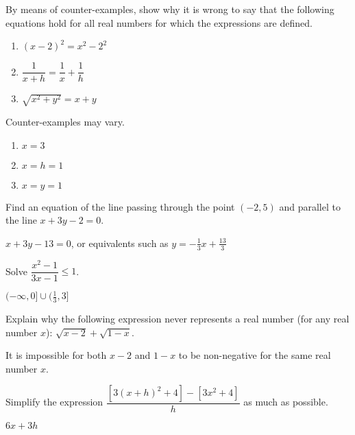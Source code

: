 \begin{enumialphparenastyle}
\begin{ex}
By means of counter-examples, show why it is wrong
to say that the following equations hold for all real numbers for which the
expressions are defined.
\begin{enumerate}
	\item	$(x-2)^2=x^2-2^2$
	\item	$\dfrac{1}{x+h}=\dfrac{1}{x}+\dfrac{1}{h}$
	\item	$\sqrt{x^2+y^2}=x+y$
\end{enumerate}
\begin{sol}
Counter-examples may vary.
\begin{enumerate}
	\item	$x=3$
	\item	$x=h=1$
	\item	$x=y=1$
\end{enumerate}
\end{sol}
\end{ex}

\begin{ex}
Find an equation of the line passing through the
point $(-2,5)$ and parallel to the line $x+3y-2=0$.
\begin{sol}
	$x+3y-13=0$, or equivalents such as $y=-\frac{1}{3}x+\frac{13}{3}$
\end{sol}
\end{ex}

\begin{ex}
Solve $\dfrac{x^2-1}{3x-1}\leq 1$.
\begin{sol}
	$(-\infty,0]\cup(\frac{1}{3},3]$
\end{sol}
\end{ex}

\begin{ex}
Explain why the following expression never
represents a real number (for any real number $x$): $\sqrt{x-2}+\sqrt{1-x}$.
\begin{sol}
	It is impossible for both $x-2$ and $1-x$ to be non-negative
	for the same real number $x$.
\end{sol}
\end{ex}

\begin{ex}
Simplify the expression $\dfrac{\left[3(x+h)^2+4\right]-\left[3x^2+4\right]}{h}$ as much as possible.
\begin{sol}
	$6x+3h$
\end{sol}
\end{ex}


\end{enumialphparenastyle}
